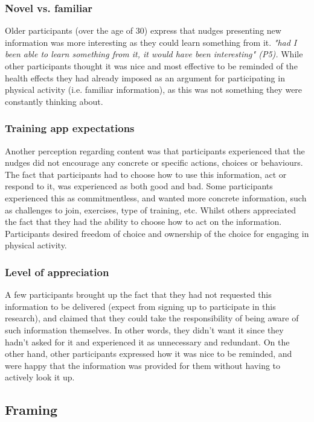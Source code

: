 \subsubsection{Novel vs. familiar}
Older participants (over the age of 30) express that nudges presenting new information was more interesting as they could learn something from it. \textit{"had I been able to learn something from it, it would have been interesting" (P5).}
While other participants thought it was nice and most effective to be reminded of the health effects they had already imposed as an argument for participating in physical activity (i.e. familiar information), as this was not something they were constantly thinking about. 

\subsubsection{Training app expectations}
Another perception regarding content was that participants experienced that the nudges did not encourage any concrete or specific actions, choices or behaviours. The fact that participants had to choose how to use this information, act or respond to it, was experienced as both good and bad. Some participants experienced this as commitmentless, and wanted more concrete information, such as challenges to join, exercises, type of training, etc. Whilst others appreciated the fact that they had the ability to choose how to act on the information. Participants desired freedom of choice and ownership of the choice for engaging in physical activity. 

\subsubsection{Level of appreciation}
A few participants brought up the fact that they had not requested this information to be delivered (expect from signing up  to participate in this research), and claimed that they could take the responsibility of being aware of such information themselves. In other words, they didn't want it since they hadn't asked for it and experienced it as unnecessary and redundant. On the other hand, other participants expressed how it was nice to be reminded, and were happy that the information was provided for them without having to actively look it up. 

\subsection{Framing}
